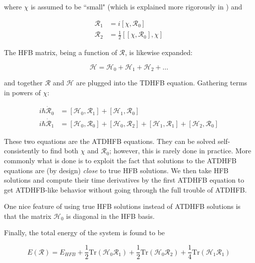 \noindent where $\chi$ is assumed to be ``small" (which is explained more rigorously in \cite{Baranger1978}) and

\begin{align}\label{eqn:densities}
\mathcal{R}_1 &= i\left[\chi, \mathcal{R}_0\right] \\
\mathcal{R}_2 &= \frac{1}{2}\left[\left[\chi, \mathcal{R}_0\right], \chi\right] 
\end{align}

\noindent The HFB matrix, being a function of $\mathcal{R}$, is likewise expanded:

\begin{equation*}
\mathcal{H} = \mathcal{H}_0 + \mathcal{H}_1 + \mathcal{H}_2 + \dots
\end{equation*}

\noindent and together $\mathcal{R}$ and $\mathcal{H}$ are plugged into the TDHFB equation. Gathering terms in powers of $\chi$:

\begin{align}\label{eqn:ATDHFB_eqns}
i\hbar\mathcal{\dot{R}}_0 &= \left[\mathcal{H}_0, \mathcal{R}_1\right] + \left[\mathcal{H}_1, \mathcal{R}_0\right] \\
i\hbar\mathcal{\dot{R}}_1 &= \left[\mathcal{H}_0, \mathcal{R}_0\right] + \left[\mathcal{H}_0, \mathcal{R}_2\right]
 + \left[\mathcal{H}_1, \mathcal{R}_1\right] + \left[\mathcal{H}_2, \mathcal{R}_0\right]
\end{align}

\noindent These two equations are the ATDHFB equations. They can be solved self-consistently to find both $\chi$ and $\mathcal{R}_0$; however, this is rarely done in practice. More commonly what is done is to exploit the fact that solutions to the ATDHFB equations are (by design) \textit{close} to true HFB solutions. We then take HFB solutions and compute their time derivatives by the first ATDHFB equation to get ATDHFB-like behavior without going through the full trouble of ATDHFB.

One nice feature of using true HFB solutions instead of ATDHFB solutions is that the matrix $\mathcal{H}_0$ is diagonal in the HFB basis.

Finally, the total energy of the system is found to be

\begin{equation*}
E(\mathcal{R}) = E_{HFB} + \frac{1}{2}\mathrm{Tr}\left(\mathcal{H}_0\mathcal{R}_1\right) + \frac{1}{2}\mathrm{Tr}\left(\mathcal{H}_0\mathcal{R}_2\right) + \frac{1}{4}\mathrm{Tr}\left(\mathcal{H}_1\mathcal{R}_1\right)
\end{equation*}

